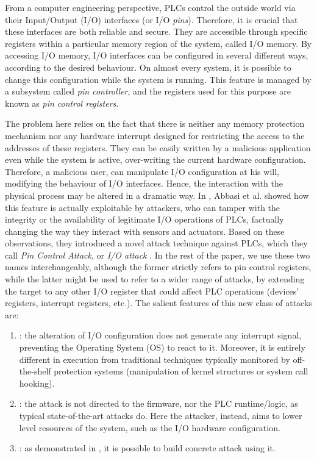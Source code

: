 From a computer engineering perspective, PLCs control the outside world via their Input/Output (I/O) interfaces (or I/O \emph{pins}).
Therefore, it is crucial that these interfaces are both reliable and secure. They are accessible through specific registers within a particular memory region of the system,
called I/O memory. By accessing I/O memory, I/O interfaces can be configured in several different ways, according to the desired behaviour.
On almost every system, it is possible to change this configuration while the system is running.
This feature is managed by a subsystem called \emph{pin controller}, and the registers used for this purpose are known as \emph{pin control registers}.

The problem here relies on the fact that there is neither any memory protection mechanism nor any hardware interrupt designed for restricting the access
to the addresses of these registers. They can be easily written by a malicious application even while the system is active, over-writing the current hardware configuration.
Therefore, a malicious user, can manipulate I/O configuration at his will, modifying the behaviour of I/O interfaces.
Hence, the interaction with the physical process may be altered in a dramatic way.
In \cite{ghostplc}, Abbasi et al. showed how this feature is actually exploitable by attackers, who can tamper with
the integrity or the availability of legitimate I/O operations of PLCs, factually changing the way they interact with sensors and actuators.
Based on these observations, they introduced a novel attack technique against PLCs, which they call \emph{Pin Control Attack}, or \emph{I/O attack} \cite{tech-ghostplc}.
In the rest of the paper, we use these two names interchangeably, although the former strictly refers to pin control registers, while the latter
might be used to refer to a wider range of attacks, by extending the target to any other I/O register that could affect PLC operations
(\eg devices' registers, interrupt registers, etc.). The salient features of this new class of attacks are:
\begin{enumerate}[itemsep=2pt,topsep=0pt]
	\item {}: the alteration of I/O configuration does not generate any interrupt signal, preventing the Operating System (OS) to react to it.
		Moreover, it is entirely different in execution from traditional techniques typically monitored by off-the-shelf protection systems
		(\eg manipulation of kernel structures or system call hooking).
	\item {}: the attack is not directed to the firmware, nor the PLC runtime/logic, as typical state-of-the-art attacks do.
		Here the attacker, instead, aims to lower level resources of the system, such as the I/O hardware configuration.
	\item {}: as demonstrated in , it is possible to build concrete attack using it.
\end{enumerate}
